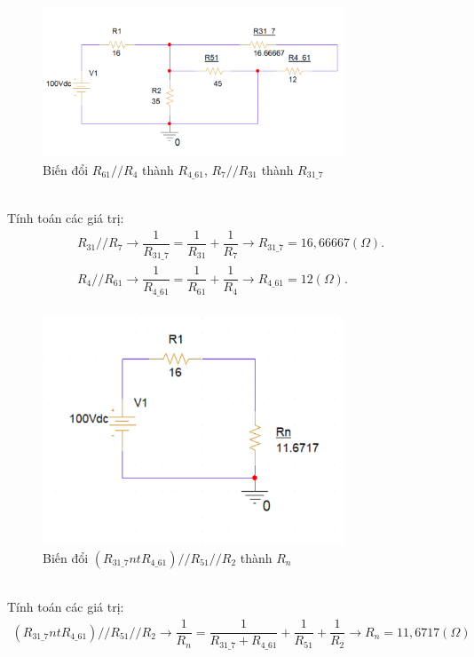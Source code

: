 \begin{itemize}
\begin{align*}
    \end{align*}
    \begin{figure}[!htbp]
        \centering
        \includegraphics[width=0.8\textwidth]{graphics/ex10/f8.png}
        \caption{Biến đổi \(R_{61} // R_4\) thành \(R_{4\_61}\), \(R_7 // R_{31}\) thành \(R_{31\_7}\)}
        \end{figure}\\
    Tính toán các giá trị:
    \begin{align*}
        R_{31} // R_7 \rightarrow \dfrac{1}{R_{31\_7}} = \dfrac{1}{R_{31}} + \dfrac{1}{R_7} \rightarrow R_{31\_7} = 16,66667 (\Omega).\\
        R_{4} // R_{61} \rightarrow \dfrac{1}{R_{4\_61}} = \dfrac{1}{R_{61}} + \dfrac{1}{R_4} \rightarrow R_{4\_61} = 12 (\Omega).\\
    \end{align*}
    \begin{figure}[!htbp]
        \centering
        \includegraphics[width=0.8\textwidth]{graphics/ex10/f5.png}
        \caption{Biến đổi \((R_{31\_7} nt R_{4\_61})//R_{51}//R_2\) thành \(R_{n}\)}
        \end{figure}\\
        Tính toán các giá trị:
        \begin{align*}
            (R_{31\_7} nt R_{4\_61})//R_{51}//R_2 \rightarrow \dfrac{1}{R_n} = \dfrac{1}{R_{31\_7} + R_{4\_61}} + \dfrac{1}{R_{51}} + \dfrac{1}{R_2} \rightarrow R_n = 11,6717 (\Omega)
        \end{align*}
        

\end{itemize}

